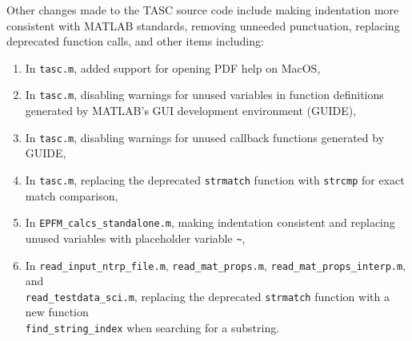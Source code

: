 Other changes made to the TASC source code include making indentation more consistent with MATLAB standards, removing unneeded punctuation, replacing deprecated function calls, and other items including:
\begin{enumerate}
\item In \verb|tasc.m|, added support for opening PDF help on MacOS,
\item In \verb|tasc.m|, disabling warnings for unused variables in function definitions generated by MATLAB's GUI development environment (GUIDE),
\item In \verb|tasc.m|, disabling warnings for unused callback functions generated by GUIDE,
\item In \verb|tasc.m|, replacing the deprecated \verb|strmatch| function with \verb|strcmp| for exact match comparison,
\item In \verb|EPFM_calcs_standalone.m|, making indentation consistent and replacing unused variables with placeholder variable \verb|~|,
\item In \verb|read_input_ntrp_file.m|, \verb|read_mat_props.m|, \verb|read_mat_props_interp.m|, and \\ \verb|read_testdata_sci.m|, replacing the deprecated \verb|strmatch| function with a new function \\ \verb|find_string_index| when searching for a substring.
\end{enumerate}
